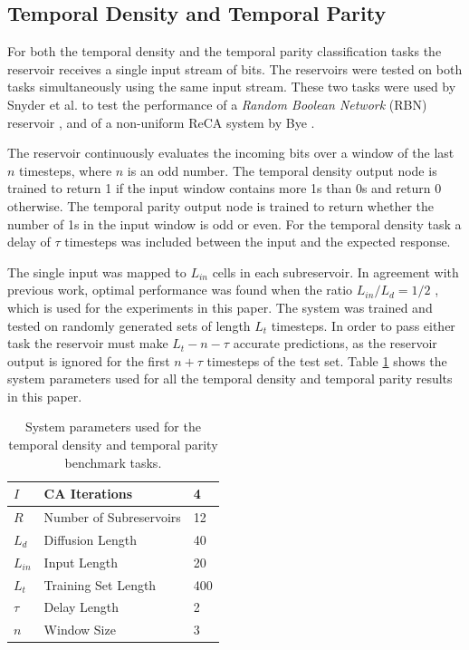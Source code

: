 \documentclass{elsarticle}
\begin{document}
\begin{multicols}{2}
	\subsection{Temporal Density and Temporal Parity}
	For both the temporal density and the temporal parity classification tasks the 
	reservoir receives a single input stream of bits. The reservoirs were 
	tested on both tasks simultaneously using the same input stream. These two 
	tasks were used by Snyder et al. to test the performance of a 
	\textit{Random Boolean Network} (RBN) reservoir 
	\cite{snyder2013computational}, and of a non-uniform ReCA system by Bye 
	\cite{bye2016investigation}. \par The reservoir continuously evaluates the 
	incoming bits over a window of the last $n$ timesteps, where $n$ is an odd 
	number. The temporal density output node is trained to return 1 if the 
	input window contains more 1s than 0s and return 0 otherwise. The temporal 
	parity output node is trained to return whether the number of 1s in the 
	input window is odd or even. For the temporal density task a delay of 
	$\tau$ timesteps was included between the input and the expected response.  
	\par The single input was mapped to $L_{in}$ cells in each subreservoir. In 
	agreement with previous work, optimal performance was found when the ratio 
	$L_{in}/L_{d} = 1/2$ \cite{bye2016investigation}, which is used for the 
	experiments in this paper. The system was trained and tested on randomly 
	generated sets of length $L_{t}$ timesteps.  In order to pass either task 
	the reservoir must make $L_{t} - n - \tau$ accurate predictions, as the 
	reservoir output is ignored for the first $n + \tau$ timesteps of the test 
	set.  Table \ref{table:temp_settings} shows the system parameters used for 
	all the temporal density and temporal parity results in this paper. 
	
	
	\begin{table}[H] \centering
		\begin{tabular}{|l|l|l|}
			\hline
			\textbf{$I$}      & CA Iterations           & 4   \\ \hline
			\textbf{$R$}      & Number of Subreservoirs & 12  \\ \hline
			\textbf{$L_{d}$}  & Diffusion Length        & 40  \\ \hline 
			\textbf{$L_{in}$} & Input Length            & 20  \\ \hline
			\textbf{$L_{t}$}  & Training Set Length     & 400 \\ \hline
			\textbf{$\tau$}   & Delay Length            & 2   \\ \hline
			\textbf{$n$}      & Window Size             & 3   \\ \hline
		\end{tabular}
		\caption{System parameters used for the temporal density and temporal parity 
		benchmark tasks.}
		\label{table:temp_settings}
	\end{table}
	

\end{multicols}
\end{document}
